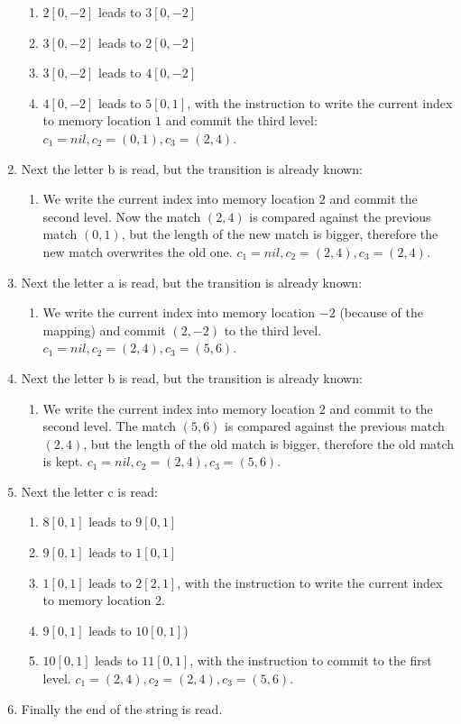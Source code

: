 \documentclass[english]{sigplanconf}
\begin{document}
\begin{enumerate}
\begin{enumerate}
\item $2[0,-2]$ leads to $3[0,-2]$
\item $3[0,-2]$ leads to $2[0,-2]$
\item $3[0,-2]$ leads to $4[0,-2]$
\item $4[0,-2]$ leads to $5[0,1]$, with the instruction to write the current
index to memory location $1$ and commit the third level: $c_{1}=nil,c_{2}=(0,1),c_{3}=(2,4)$.
\end{enumerate}
\item Next the letter b is read, but the transition is already known:

\begin{enumerate}
\item We write the current index into memory location $2$ and commit the
second level. Now the match $(2,4)$ is compared against the previous
match $(0,1)$, but the length of the new match is bigger, therefore
the new match overwrites the old one. $c_{1}=nil,c_{2}=(2,4),c_{3}=(2,4)$.
\end{enumerate}
\item Next the letter a is read, but the transition is already known:

\begin{enumerate}
\item We write the current index into memory location $-2$ (because of
the mapping) and commit $(2,-2)$ to the third level. $c_{1}=nil,c_{2}=(2,4),c_{3}=(5,6)$.
\end{enumerate}
\item Next the letter b is read, but the transition is already known:

\begin{enumerate}
\item We write the current index into memory location $2$ and commit to
the second level. The match $(5,6)$ is compared against the previous
match $(2,4)$, but the length of the old match is bigger, therefore
the old match is kept. $c_{1}=nil,c_{2}=(2,4),c_{3}=(5,6)$.
\end{enumerate}
\item Next the letter c is read:

\begin{enumerate}
\item $8[0,1]$ leads to $9[0,1]$
\item $9[0,1]$ leads to $1[0,1]$
\item $1[0,1]$ leads to $2[2,1]$, with the instruction to write the current
index to memory location $2$.
\item $9[0,1]$ leads to $10[0,1]$)
\item $10[0,1]$ leads to $11[0,1]$, with the instruction to commit to
the first level. $c_{1}=(2,4),c_{2}=(2,4),c_{3}=(5,6)$.
\end{enumerate}
\item Finally the end of the string is read.


\end{enumerate}
\end{document}
